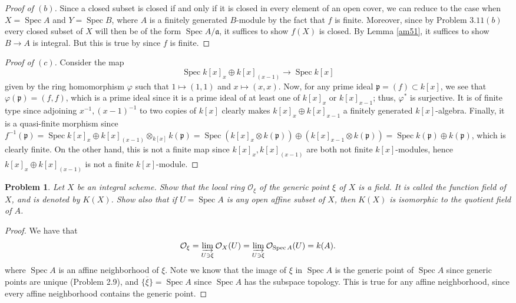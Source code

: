 \documentclass[12pt,letterpaper]{article}
\newtheorem{problem}{Problem}[section]
\theoremstyle{definition}
\theoremstyle{remark}
\numberwithin{equation}{section}
\numberwithin{figure}{problem}
\DeclareMathOperator{\Spec}{Spec}
\newcommand{\OO}{\mathcal{O}}
\begin{document}
\begin{proof}[Proof of $(b)$]
  Since a closed subset is closed if and only if it is closed in every element of an open cover, we can reduce to the case when $X = \Spec A$ and $Y = \Spec B$, where $A$ is a finitely generated $B$-module by the fact that $f$ is finite. Moreover, since by Problem $3.11(b)$ every closed subset of $X$ will then be of the form $\Spec A/\mathfrak{a}$, it suffices to show $f(X)$ is closed. By Lemma \ref{am51}, it suffices to show $B \to A$ is integral. But this is true by \cite[Prop.~5.1]{AM69} since $f$ is finite.
\end{proof}
\begin{proof}[Proof of $(c)$]
  Consider the map
  \begin{equation*}
    \Spec k[x]_x \oplus k[x]_{(x-1)} \to \Spec k[x]
  \end{equation*}
  given by the ring homomorphism $\varphi$ such that $1 \mapsto (1,1)$ and $x \mapsto (x,x)$. Now, for any prime ideal $\mathfrak{p} = (f) \subset k[x]$, we see that $\varphi(\mathfrak{p}) = (f,f)$, which is a prime ideal since it is a prime ideal of at least one of $k[x]_x$ or $k[x]_{x-1}$; thus, $\varphi^*$ is surjective. It is of finite type since adjoining $x^{-1},(x-1)^{-1}$ to two copies of $k[x]$ clearly makes $k[x]_x \oplus k[x]_{x-1}$ a finitely generated $k[x]$-algebra. Finally, it is a quasi-finite morphism since $f^{-1}(\mathfrak{p}) = \Spec k[x]_x \oplus k[x]_{(x-1)} \otimes_{k[x]} k(\mathfrak{p}) = \Spec (k[x]_x \otimes k(\mathfrak{p})) \oplus (k[x]_{x-1} \otimes k(\mathfrak{p})) = \Spec k(\mathfrak{p}) \oplus k(\mathfrak{p})$, which is clearly finite. On the other hand, this is not a finite map since $k[x]_x,k[x]_{(x-1)}$ are both not finite $k[x]$-modules, hence $k[x]_x \oplus k[x]_{(x-1)}$ is not a finite $k[x]$-module.
\end{proof}

\begin{problem}
  Let $X$ be an integral scheme. Show that the local ring $\OO_\xi$ of the generic point $\xi$ of $X$ is a field. It is called the \emph{function field} of $X$, and is denoted by $K(X)$. Show also that if $U = \Spec A$ is any open affine subset of $X$, then $K(X)$ is isomorphic to the quotient field of $A$.
\end{problem}
\begin{proof}
  We have that
  \begin{equation*}
    \OO_\xi = \varinjlim_{U \ni \xi} \OO_X(U) = \varinjlim_{U \ni \xi} \OO_{\Spec A}(U) = k(A).
  \end{equation*}
  where $\Spec A$ is an affine neighborhood of $\xi$. Note we know that the image of $\xi$ in $\Spec A$ is the generic point of $\Spec A$ since generic points are unique (Problem 2.9), and $\overline{\{\xi\}} = \Spec A$ since $\Spec A$ has the subspace topology. This is true for any affine neighborhood, since every affine neighborhood contains the generic point.
\end{proof}
\end{document}
